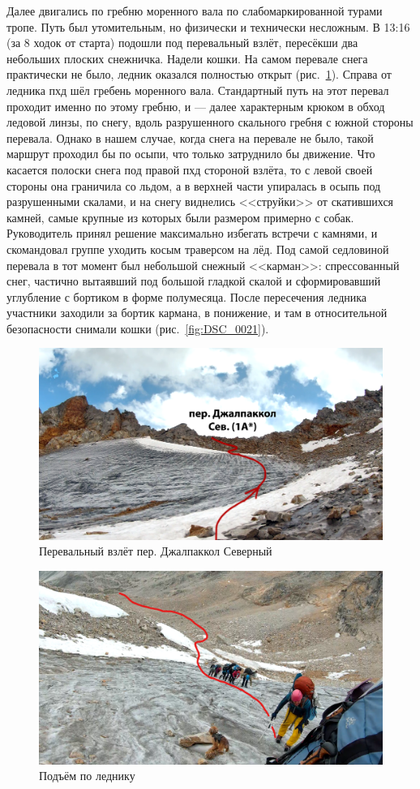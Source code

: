 Далее двигались по гребню моренного вала по слабомаркированной турами тропе. Путь был утомительным, но физически и технически несложным. В 13:16 (за 8 ходок от старта) подошли под перевальный взлёт, пересёкши два небольших плоских снежничка. Надели кошки. На самом перевале снега практически не было, ледник  оказался полностью открыт (рис.~\ref{fig:dzh_1}). Справа от ледника пхд шёл гребень моренного вала. Стандартный путь на этот перевал проходит именно по этому гребню, и --- далее характерным крюком в обход ледовой линзы, по снегу, вдоль разрушенного скального гребня с южной стороны перевала. Однако в нашем случае, когда снега на перевале не было, такой маршрут проходил бы по осыпи, что только затруднило бы движение. Что касается полоски снега под правой пхд стороной взлёта, то с левой своей стороны она граничила со льдом, а в верхней части упиралась в осыпь под разрушенными скалами, и на снегу виднелись <<струйки>> от скатившихся камней, самые крупные из которых были размером примерно с собак. Руководитель принял решение максимально избегать встречи с камнями, и скомандовал группе уходить косым траверсом на лёд. Под самой седловиной перевала в тот момент был небольшой снежный <<карман>>: спрессованный снег, частично вытаявший под большой гладкой скалой и сформировавший углубление с бортиком в форме полумесяца. После пересечения ледника участники заходили за бортик кармана, в понижение, и там в относительной безопасности снимали кошки (рис.~\ref{fig:DSC_0021}).

\begin{figure}[h!]
	\centering
	\includegraphics[width=0.7\linewidth]{../pics/dzh_1}
	\caption{Перевальный взлёт пер. Джалпаккол Северный}
	\label{fig:dzh_1}
\end{figure}

\begin{figure}[h!]	
	\centering
	\includegraphics[angle=0, width=0.7\linewidth]{../pics/gopro_dzh}
	\caption{Подъём по леднику}
	\label{fig:gopro_dzh}
\end{figure}


